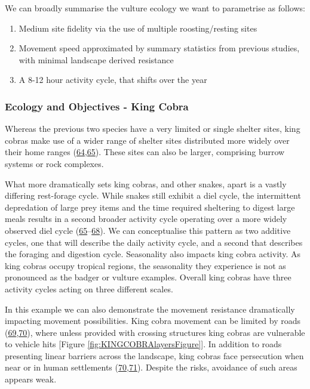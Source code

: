 \documentclass[10pt,a4paper]{article}
\begin{document}
We can broadly summarise the vulture ecology we want to parametrise as follows:

\begin{enumerate}
\def\labelenumi{\arabic{enumi}.}
\item
  Medium site fidelity via the use of multiple roosting/resting sites
\item
  Movement speed approximated by summary statistics from previous studies, with minimal landscape derived resistance
\item
  A 8-12 hour activity cycle, that shifts over the year
\end{enumerate}

\hypertarget{ecology-and-objectives---king-cobra}{%
\subsubsection{Ecology and Objectives - King Cobra}\label{ecology-and-objectives---king-cobra}}

Whereas the previous two species have a very limited or single shelter sites, king cobras make use of a wider range of shelter sites distributed more widely over their home ranges (\protect\hyperlink{ref-Marshall2018}{64},\protect\hyperlink{ref-marshall_no_2020}{65}).
These sites can also be larger, comprising burrow systems or rock complexes.

What more dramatically sets king cobras, and other snakes, apart is a vastly differing rest-forage cycle.
While snakes still exhibit a diel cycle, the intermittent depredation of large prey items and the time required sheltering to digest large meals results in a second broader activity cycle operating over a more widely observed diel cycle (\protect\hyperlink{ref-marshall_no_2020}{65}--\protect\hyperlink{ref-Siers2018}{68}).
We can conceptualise this pattern as two additive cycles, one that will describe the daily activity cycle, and a second that describes the foraging and digestion cycle.
Seasonality also impacts king cobra activity.
As king cobras occupy tropical regions, the seasonality they experience is not as pronounced as the badger or vulture examples.
Overall king cobras have three activity cycles acting on three different scales.

In this example we can also demonstrate the movement resistance dramatically impacting movement possibilities.
King cobra movement can be limited by roads (\protect\hyperlink{ref-jones_how_2022}{69},\protect\hyperlink{ref-Marshall2018b}{70}), where unless provided with crossing structures king cobras are vulnerable to vehicle hits {[}Figure \ref{fig:KINGCOBRAlayersFigure}{]}.
In addition to roads presenting linear barriers across the landscape, king cobras face persecution when near or in human settlements (\protect\hyperlink{ref-Marshall2018b}{70},\protect\hyperlink{ref-Shankar2013}{71}).
Despite the risks, avoidance of such areas appears weak.
\end{document}
